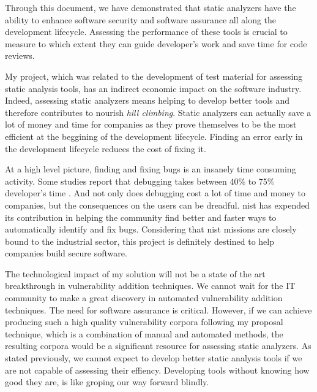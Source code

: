 Through this document, we have demonstrated that static analyzers have the ability to enhance software security and software assurance all along the development lifecycle. Assessing the performance of these tools is crucial to measure to which extent they can guide developer's work and save time for code reviews.

My project, which was related to the development of test material for assessing static analysis tools, has an indirect economic impact on the software industry. Indeed, assessing static analyzers means helping to develop better tools and therefore contributes to nourish \emph{hill climbing}. Static analyzers can actually save a lot of money and time for companies as they prove themselves to be the most efficient at the beggining of the development lifecycle. Finding an error early in the development lifecycle reduces the cost of fixing it.

At a high level picture, finding and fixing bugs is an insanely time consuming activity. Some studies report that debugging takes between 40\% to 75\% developer's time \cite{dolan2016million}. And not only does debugging cost a lot of time and money to companies, but the consequences on the users can be dreadful. \gls{nist} has expended its contribution in helping the community find better and faster ways to automatically identify and fix bugs. Considering that \gls{nist} missions are closely bound to the industrial sector, this project is definitely destined to help companies build secure software.

The technological impact of my solution will not be a state of the art breakthrough in vulnerability addition techniques. We cannot wait for the IT community to make a great discovery in automated vulnerability addition techniques. The need for software assurance is critical. However, if we can achieve producing such a high quality vulnerability corpora following my proposal technique, which is a combination of manual and automated methods, the resulting corpora would be a significant resource for assessing static analyzers. As stated previously, we cannot expect to develop better static analysis tools if we are not capable of assessing their effiency. Developing tools without knowing how good they are, is like groping our way forward blindly.